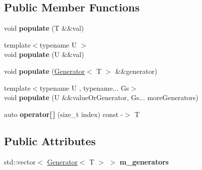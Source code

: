 \subsection*{Public Member Functions}
\begin{DoxyCompactItemize}
\item 
\mbox{\label{structCatch_1_1Generators_1_1Generators_ad708036fa5a9bf0cd1520ce111bc851d}} 
void {\bfseries populate} (T \&\&val)
\item 
\mbox{\label{structCatch_1_1Generators_1_1Generators_a8ff8b7dda734d1808b644fefc67f4c98}} 
{\footnotesize template$<$typename U $>$ }\\void {\bfseries populate} (U \&\&val)
\item 
\mbox{\label{structCatch_1_1Generators_1_1Generators_a2155cad48ab03c362483e200d957eefc}} 
void {\bfseries populate} (\mbox{\hyperlink{classCatch_1_1Generators_1_1Generator}{Generator}}$<$ T $>$ \&\&generator)
\item 
\mbox{\label{structCatch_1_1Generators_1_1Generators_a4b9680ee28e48e4dc4c4538b5510e649}} 
{\footnotesize template$<$typename U , typename... Gs$>$ }\\void {\bfseries populate} (U \&\&value\+Or\+Generator, Gs... more\+Generators)
\item 
\mbox{\label{structCatch_1_1Generators_1_1Generators_a1812ebb7d0146d63e3a005e93831afa2}} 
auto {\bfseries operator\mbox{[}$\,$\mbox{]}} (size\+\_\+t index) const -\/$>$ T
\end{DoxyCompactItemize}
\subsection*{Public Attributes}
\begin{DoxyCompactItemize}
\item 
\mbox{\label{structCatch_1_1Generators_1_1Generators_a49f1d0e8851a4726bb9981edffe094fa}} 
std\+::vector$<$ \mbox{\hyperlink{classCatch_1_1Generators_1_1Generator}{Generator}}$<$ T $>$ $>$ {\bfseries m\+\_\+generators}
\end{DoxyCompactItemize}
